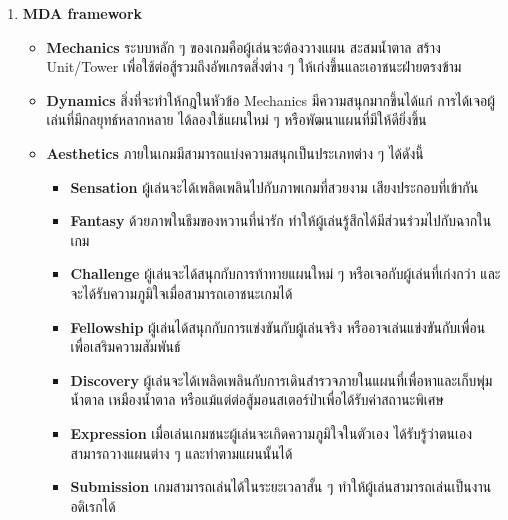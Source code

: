 \documentclass[12pt,oneside,openright,a4paper]{cpe-thai-project}
\begin{document}
\begin{enumerate}
  \item \textbf{MDA framework}
  \begin{itemize}
    \item \textbf{Mechanics} ระบบหลัก ๆ ของเกมคือผู้เล่นจะต้องวางแผน 
    สะสมน้ำตาล สร้าง Unit/Tower เพื่อใช้ต่อสู้รวมถึงอัพเกรดสิ่งต่าง ๆ ให้เก่งขึ้นและเอาชนะฝ่ายตรงข้าม
    \item \textbf{Dynamics} สิ่งที่จะทำให้กฎในหัวข้อ Mechanics 
    มีความสนุกมากขึ้นได้แก่ การได้เจอผู้เล่นที่มีกลยุทธ์หลากหลาย ได้ลองใช้แผนใหม่ ๆ หรือพัฒนาแผนที่มีให้ดียิ่งขึ้น
    \item \textbf{Aesthetics} ภายในเกมมีสามารถแบ่งความสนุกเป็นประเภทต่าง ๆ ได้ดังนี้
    \begin{itemize}
      \item \textbf{Sensation} ผู้เล่นจะได้เพลิดเพลินไปกับภาพเกมที่สวยงาม เสียงประกอบที่เข้ากัน
      \item \textbf{Fantasy} ด้วยภาพในธีมของหวานที่น่ารัก ทำให้ผู้เล่นรู้สึกได้มีส่วนร่วมไปกับฉากในเกม
      \item \textbf{Challenge} ผู้เล่นจะได้สนุกกับการท้าทายแผนใหม่ ๆ หรือเจอกับผู้เล่นที่เก่งกว่า 
      และจะได้รับความภูมิใจเมื่อสามารถเอาชนะเกมได้
      \item \textbf{Fellowship} ผู้เล่นได้สนุกกับการแข่งขันกับผู้เล่นจริง 
      หรืออาจเล่นแข่งขันกับเพื่อนเพื่อเสริมความสัมพันธ์
      \item \textbf{Discovery} ผู้เล่นจะได้เพลิดเพลินกับการเดินสำรวจภายในแผนที่เพื่อหาและเก็บพุ่มน้ำตาล 
      เหมืองน้ำตาล หรือแม้แต่ต่อสู้มอนสเตอร์ป่าเพื่อได้รับค่าสถานะพิเศษ
      \item \textbf{Expression} เมื่อเล่นเกมชนะผู้เล่นจะเกิดความภูมิใจในตัวเอง 
      ได้รับรู้ว่าตนเองสามารถวางแผนต่าง ๆ และทำตามแผนนั้นได้
      \item \textbf{Submission} เกมสามารถเล่นได้ในระยะเวลาสั้น ๆ ทำให้ผู้เล่นสามารถเล่นเป็นงานอดิเรกได้	
    \end{itemize} 
  \end{itemize}
\end{enumerate}

\pagebreak
\end{document}

